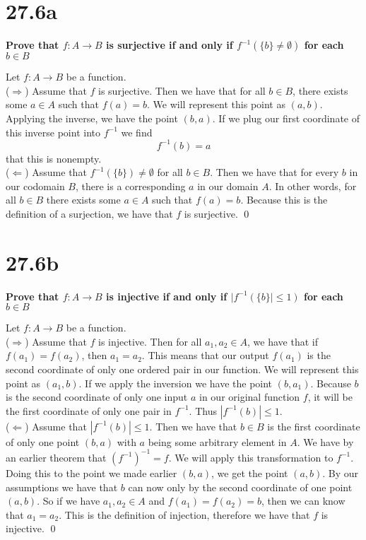 \documentclass{article}
\begin{document}
\section*{27.6a}
\textbf{Prove that $f:A \rightarrow B$ is surjective if and only if $f^{-1}(\{b\} \neq \emptyset)$ for each $b \in B$}

\bigskip

\proof Let $f: A \rightarrow B$ be a function.\\
($\Rightarrow$) Assume that $f$ is surjective. Then we have that for all $b \in B$, there exists some $a \in A$ such that $f(a) = b$. We will represent this point as $(a, b)$. Applying the inverse, we have the point $(b,a)$. If we plug our first coordinate of this inverse point into $f^{-1}$ we find
\[
f^{-1}(b) = a
\]
that this is nonempty.\\
($\Leftarrow$) Assume that $f^{-1}(\{b\}) \neq \emptyset$ for all $b \in B$. Then we have that for every $b$ in our codomain $B$, there is a corresponding $a$ in our domain $A$. In other words, for all $b \in B$ there exists some $a \in A$ such that $f(a) = b$. Because this is the definition of a surjection, we have that $f$ is surjective. \qed

\section*{27.6b}
\textbf{Prove that $f:A \rightarrow B$ is injective if and only if $|f^{-1}(\{b\}| \leq 1)$ for each $b \in B$}\\

\bigskip

\proof Let $f:A \rightarrow B$ be a function.\\
($\Rightarrow$) Assume that $f$ is injective. Then for all $a_1, a_2 \in A$, we have that if $f(a_1) = f(a_2)$, then $a_1 = a_2$. This means that our output $f(a_1)$ is the second coordinate of only one ordered pair in our function. We will represent this point as $(a_1, b)$. If we apply the inversion we have the point $(b, a_1)$. Because $b$ is the second coordinate of only one input $a$ in our original function $f$, it will be the first coordinate of only one pair in $f^{-1}$. Thus $|f^{-1}(b)| \leq 1$.\\
($\Leftarrow$) Assume that $|f^{-1}(b)| \leq 1$. Then we have that $b \in B$ is the first coordinate of only one point $(b, a)$ with $a$ being some arbitrary element in $A$. We have by an earlier theorem that $(f^{-1})^{-1} = f$. We will apply this transformation to $f^{-1}$. Doing this to the point we made earlier $(b, a)$, we get the point $(a, b)$. By our assumptions we have that $b$ can now only by the second coordinate of one point $(a,b)$. So if we have $a_1, a_2 \in A$ and $f(a_1) = f(a_2) = b$, then we can know that $a_1 = a_2$. This is the definition of injection, therefore we have that $f$ is injective. \qed
\end{document}
